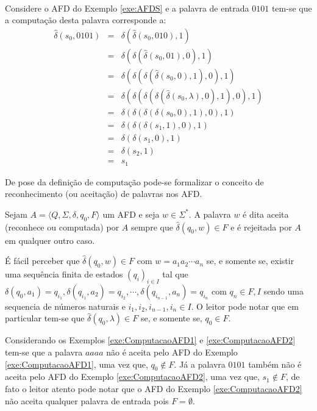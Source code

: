 \

\begin{exem}\label{exe:ComputacaoAFD2}
	Considere o AFD do Exemplo \ref{exe:AFDS} e a palavra de entrada $0101$ tem-se que a computação desta palavra corresponde a:
	\begin{eqnarray*}
		\widehat{\delta}(s_0, 0101) & = & \delta(\widehat{\delta}(s_0, 010), 1)\\
		& = & \delta(\delta(\widehat{\delta}(s_0, 01), 0), 1)\\
		& = & \delta(\delta(\delta(\widehat{\delta}(s_0, 0), 1), 0), 1)\\
		& = & \delta(\delta(\delta(\delta(\widehat{\delta}(s_0, \lambda), 0), 1), 0), 1)\\
		& = & \delta(\delta(\delta(\delta(s_0, 0), 1), 0), 1)\\
		& = & \delta(\delta(\delta(s_1, 1), 0), 1)\\
		& = & \delta(\delta(s_1, 0), 1)\\
		& = & \delta(s_2, 1)\\
		& = & s_1
	\end{eqnarray*}
\end{exem}

De pose da definição de computação pode-se formalizar o conceito de reconhecimento (ou aceitação) de palavras nos AFD.

\begin{definition}\label{defi:PalavraAceitaPorAFD}
	\cite{benjaLivro2010} Sejam $A = \langle Q, \Sigma, \delta, q_0, F\rangle$ um AFD e seja $w \in \Sigma^*$. A palavra $w$ é dita aceita (reconhece ou computada) por $A$ sempre que $\widehat{\delta}(q_0, w) \in F$ e é rejeitada por $A$ em qualquer outro caso.
\end{definition}

É fácil perceber que $\widehat{\delta}(q_0, w) \in F$ com $w = a_1a_2\cdots a_n$ se, e somente se, existir uma sequência finita de estados $(q_i)_{i \in I}$ tal que $\delta(q_0, a_1) = q_{i_1}, \delta(q_{i_1}, a_2) = q_{i_2}, \cdots, \delta(q_{i_{n-1}}, a_{n}) = q_{i_n}$ com $q_n \in F, I$ sendo uma sequencia de números naturais e $i_1, i_2, i_{n-1}, i_n \in I$. O leitor pode notar que em particular tem-se que $\widehat{\delta}(q_0, \lambda) \in F$ se, e somente se, $q_0 \in F$.

\begin{exem}\label{exe:AceiteAFD1}
	Considerando os Exemplos \ref{exe:ComputacaoAFD1} e \ref{exe:ComputacaoAFD2} tem-se que a palavra $aaaa$ não é aceita pelo AFD do Exemplo \ref{exe:ComputacaoAFD1}, uma vez que, $q_0 \notin F$. Já a palavra $0101$ também não é aceita pelo AFD do Exemplo \ref{exe:ComputacaoAFD2}, uma vez que, $s_1 \notin F$, de fato o leitor atento pode notar que o AFD do Exemplo \ref{exe:ComputacaoAFD2} não aceita qualquer palavra de entrada pois $F = \emptyset$.
\end{exem}
 
